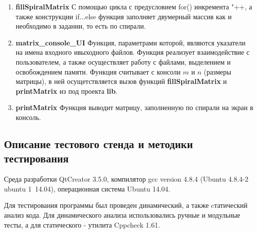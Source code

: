 \documentclass[12pt,a4paper]{report}
\begin{document}
\begin{enumerate}

		\item \textbf{fillSpiralMatrix}
	С помощью цикла с предусловием for() инкремента "++, а также конструкции if...else функция заполняет двумерный массив как и необходимо в задании, то есть по спирали. 	 
	
		\item \textbf{matrix\_console\_UI}	
	Функция, параметрами которой, являются указатели на имена входного ивыходного файлов. Функция реализует взаимодействие с пользователем, а также осуществляет работу с файлами, выделением и освобождением памяти. Функция считывает с консоли $m$ и $n$ (размеры матрицы), в ней осущетствляется вызов функций \textbf{fillSpiralMatrix} и \textbf{printMatrix} из под проекта \textbf{lib}.
	
		\item \textbf{printMatrix}
	Функция выводит матрицу, заполненную по спирали на экран в консоль.

\end{enumerate}

\subsection{Описание тестового стенда и методики тестирования}
\hspace{\parindent}
Среда разработки QtCreator 3.5.0, компилятор gcc version 4.8.4 (Ubuntu 4.8.4-2 ubuntu 1~14.04), операционная система Ubuntu 14.04. 

Для тестирования программы был проведен динамический, а также cтатический анализ кода. Для динамического анализа использовались ручные и модульные тесты, а для статического - утилита Cppcheck 1.61.
\end{document}
